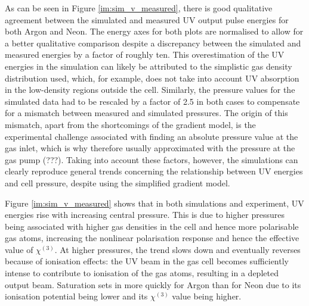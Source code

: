 \documentclass[a4paper]{jpconf}
\begin{document}
As can be seen in Figure \ref{im:sim_v_measured}, there is good qualitative agreement between the simulated and measured UV output pulse energies for both Argon and Neon. The energy axes for both plots are normalised to allow for a better qualitative comparison despite a discrepancy between the simulated and measured energies by a factor of roughly ten. This overestimation of the UV energies in the simulation can likely be attributed to the simplistic gas density distribution used, which, for example, does not take into account UV absorption in the low-density regions outside the cell. Similarly, the pressure values for the simulated data had to be rescaled by a factor of 2.5 in both cases to compensate for a mismatch between measured and simulated pressures. The origin of this mismatch, apart from the shortcomings of the gradient model, is the experimental challenge associated with finding an absolute pressure value at the gas inlet, which is why therefore usually approximated with the pressure at the gas pump (???). Taking into account these factors, however, the simulations can clearly reproduce general trends concerning the relationship between UV energies and cell pressure, despite using the simplified gradient model. \par 
Figure \ref{im:sim_v_measured} shows that in both simulations and experiment, UV energies rise with increasing central pressure. This is due to higher pressures being associated with higher gas densities in the cell and hence more polarisable gas atoms, increasing the nonlinear polarisation response and hence the effective value of $\chi^{(3)}$. At higher pressures, the trend slows down and eventually reverses because of ionisation effects: the UV beam in the gas cell becomes sufficiently intense to contribute to ionisation of the gas atoms, resulting in a depleted output beam. Saturation sets in more quickly for Argon than for Neon due to its ionisation potential being lower and its $\chi^{(3)}$ value being higher. \par 
\end{document}
